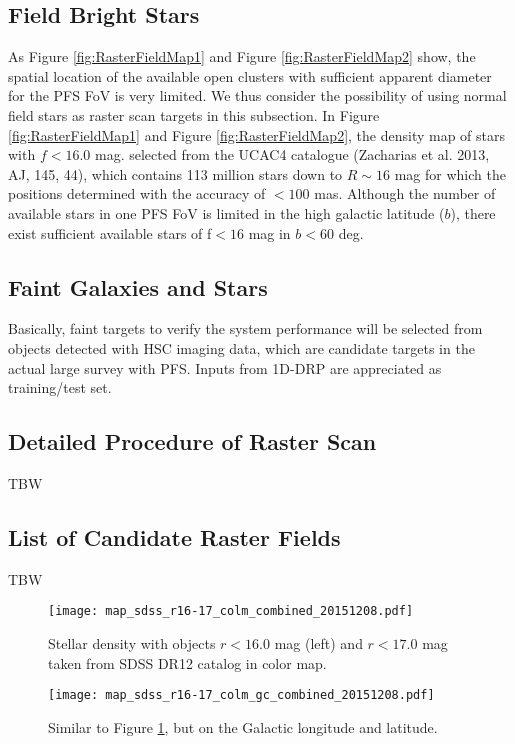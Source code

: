 \subsection{Field Bright Stars}
As Figure \ref{fig:RasterFieldMap1} and Figure \ref{fig:RasterFieldMap2} show, the spatial location of the available open clusters with sufficient apparent diameter for the PFS FoV is very limited. We thus consider the possibility of using normal field stars as raster scan targets in this subsection. In Figure \ref{fig:RasterFieldMap1} and Figure \ref{fig:RasterFieldMap2}, the density map of stars with $f<16.0$ mag. selected from the UCAC4 catalogue (Zacharias et al. 2013, AJ, 145, 44), which contains 113 million stars down to $R\sim16$ mag for which the positions determined with the accuracy of $<100$ mas. Although the number of available stars in one PFS FoV is limited in the high galactic latitude ($b$), there exist sufficient available stars of f$<16$ mag in $b<60$ deg.

\subsection{Faint Galaxies and Stars}
Basically, faint targets to verify the system performance will be selected from objects detected with HSC imaging data, which are candidate targets in the actual large survey with PFS. 
Inputs from 1D-DRP are appreciated as training/test set.

\subsection{Detailed Procedure of Raster Scan}
TBW

\subsection{List of Candidate Raster Fields}
TBW

\begin{figure}[!ht]
\begin{center}
\texttt{[image: map\_sdss\_r16-17\_colm\_combined\_20151208.pdf]}
\end{center}
\caption{Stellar density with objects $r<16.0$ mag (left) and $r<17.0$ mag taken from SDSS DR12 catalog in color map. 
}
\label{fig:RasterFieldMapSDSS1}
\end{figure}

\begin{figure}[!ht]
\begin{center}
\texttt{[image: map\_sdss\_r16-17\_colm\_gc\_combined\_20151208.pdf]}
\end{center}
\caption{Similar to Figure \ref{fig:RasterFieldMapSDSS1}, but on the Galactic longitude and latitude.
}
\label{fig:RasterFieldMapSDSS2}
\end{figure}


